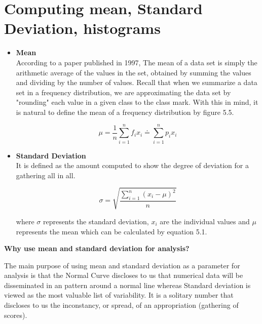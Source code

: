 \newpage

\section{Computing mean, Standard Deviation, histograms}

\begin{itemize}
    \item \textbf{Mean} \\
    According to a paper published in 1997, The mean of a data set is simply the arithmetic average of the values in the set, obtained by summing the values and dividing by the number of values. Recall that when we summarize a data set in a frequency distribution, we are approximating the data set by "rounding" each value in a given class to the class mark. With this in mind, it is natural to define the mean of a frequency distribution by figure 5.5. \cite{Mean_SD}
    
    \begin{equation} \label{eq:mean_formula}
       \mu = \frac{1}{n} \sum\limits_{i=1}^{n}f_{i}x_{i} \doteq \sum\limits_{i=1}^{n}p_{i}x_{i}
    \end{equation}
    
    \item \textbf{Standard Deviation} \\
   It is defined as the amount computed to show the degree of deviation for a gathering all in all.
   
  \begin{equation} \label{eq:standarddeviation_formula}
      \sigma = \sqrt{\frac{\sum\limits_{i=1}^{n}(x_{i} - \mu)^2}{n}}
    \end{equation}
    

where $\sigma$ represents the standard deviation, $x_{i}$ are the individual values and $\mu$ represents the mean which can be calculated by equation 5.1.
    
\end{itemize}

\centerline{\textbf{Why use mean and standard deviation for analysis?}}

The main purpose of using mean and standard deviation as a parameter for analysis is that the Normal Curve discloses to us that numerical data will be disseminated in an pattern around a normal line whereas Standard deviation is viewed as the most valuable list of variability. It is a solitary number that discloses to us the inconstancy, or spread, of an appropriation (gathering of scores).

